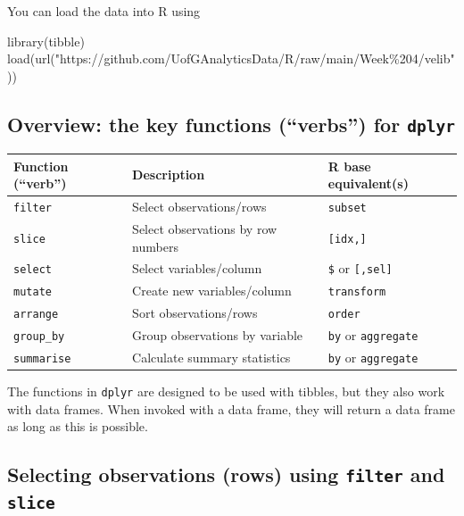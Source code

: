 \documentclass[
]{book}
\newenvironment{Shaded}{\begin{snugshade}}{\end{snugshade}}
\newcommand{\FunctionTok}[1]{\textcolor[rgb]{0.00,0.00,0.00}{#1}}
\newcommand{\NormalTok}[1]{#1}
\newcommand{\StringTok}[1]{\textcolor[rgb]{0.31,0.60,0.02}{#1}}
\begin{document}
You can load the data into R using

\begin{Shaded}
\begin{Highlighting}[]
\FunctionTok{library}\NormalTok{(tibble)}
\FunctionTok{load}\NormalTok{(}\FunctionTok{url}\NormalTok{(}\StringTok{"https://github.com/UofGAnalyticsData/R/raw/main/Week\%204/velib"}\NormalTok{))}
\end{Highlighting}
\end{Shaded}

\hypertarget{overview-the-key-functions-verbs-for-dplyr}{%
\subsection{\texorpdfstring{Overview: the key functions (``verbs'') for \texttt{dplyr}}{Overview: the key functions (``verbs'') for dplyr}}\label{overview-the-key-functions-verbs-for-dplyr}}

\begin{longtable}[]{@{}lll@{}}
\toprule()
Function (``verb'') & Description & R base equivalent(s) \\
\midrule()
\endhead
\texttt{filter} & Select observations/rows & \texttt{subset} \\
\texttt{slice} & Select observations by row numbers & \texttt{{[}idx,{]}} \\
\texttt{select} & Select variables/column & \texttt{\$} or \texttt{{[},sel{]}} \\
\texttt{mutate} & Create new variables/column & \texttt{transform} \\
\texttt{arrange} & Sort observations/rows & \texttt{order} \\
\texttt{group\_by} & Group observations by variable & \texttt{by} or \texttt{aggregate} \\
\texttt{summarise} & Calculate summary statistics & \texttt{by} or \texttt{aggregate} \\
\bottomrule()
\end{longtable}

The functions in \texttt{dplyr} are designed to be used with tibbles, but they also work with data frames. When invoked with a data frame, they will return a data frame as long as this is possible.

\hypertarget{selecting-observations-rows-using-filter-and-slice}{%
\subsection{\texorpdfstring{Selecting observations (rows) using \texttt{filter} and \texttt{slice}}{Selecting observations (rows) using filter and slice}}\label{selecting-observations-rows-using-filter-and-slice}}
\end{document}
